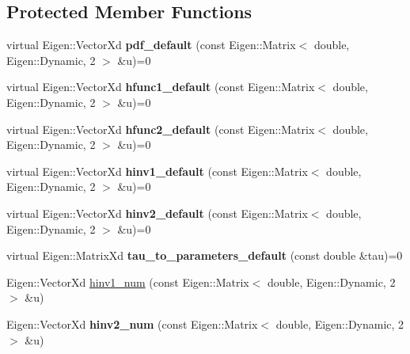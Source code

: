 \subsection*{Protected Member Functions}
\begin{DoxyCompactItemize}
\item 
virtual Eigen\+::\+Vector\+Xd {\bfseries pdf\+\_\+default} (const Eigen\+::\+Matrix$<$ double, Eigen\+::\+Dynamic, 2 $>$ \&u)=0\hypertarget{classvinecopulib_1_1_bicop_ab7ca8f265c7246a619324b6a2b9b33cb}{}\label{classvinecopulib_1_1_bicop_ab7ca8f265c7246a619324b6a2b9b33cb}

\item 
virtual Eigen\+::\+Vector\+Xd {\bfseries hfunc1\+\_\+default} (const Eigen\+::\+Matrix$<$ double, Eigen\+::\+Dynamic, 2 $>$ \&u)=0\hypertarget{classvinecopulib_1_1_bicop_a158a311fcf681027811785702452b888}{}\label{classvinecopulib_1_1_bicop_a158a311fcf681027811785702452b888}

\item 
virtual Eigen\+::\+Vector\+Xd {\bfseries hfunc2\+\_\+default} (const Eigen\+::\+Matrix$<$ double, Eigen\+::\+Dynamic, 2 $>$ \&u)=0\hypertarget{classvinecopulib_1_1_bicop_a7f23a0b1fc04c483a0dcf489700a0f30}{}\label{classvinecopulib_1_1_bicop_a7f23a0b1fc04c483a0dcf489700a0f30}

\item 
virtual Eigen\+::\+Vector\+Xd {\bfseries hinv1\+\_\+default} (const Eigen\+::\+Matrix$<$ double, Eigen\+::\+Dynamic, 2 $>$ \&u)=0\hypertarget{classvinecopulib_1_1_bicop_acb3ae8d10e8af947d2edd78f960b5f78}{}\label{classvinecopulib_1_1_bicop_acb3ae8d10e8af947d2edd78f960b5f78}

\item 
virtual Eigen\+::\+Vector\+Xd {\bfseries hinv2\+\_\+default} (const Eigen\+::\+Matrix$<$ double, Eigen\+::\+Dynamic, 2 $>$ \&u)=0\hypertarget{classvinecopulib_1_1_bicop_a2b9ccdd26482622c2487b0440b0621b1}{}\label{classvinecopulib_1_1_bicop_a2b9ccdd26482622c2487b0440b0621b1}

\item 
virtual Eigen\+::\+Matrix\+Xd {\bfseries tau\+\_\+to\+\_\+parameters\+\_\+default} (const double \&tau)=0\hypertarget{classvinecopulib_1_1_bicop_aaa9065f566b333feccafbe19e17f3052}{}\label{classvinecopulib_1_1_bicop_aaa9065f566b333feccafbe19e17f3052}

\end{DoxyCompactItemize}
{\bf }\par
\begin{DoxyCompactItemize}
\item 
Eigen\+::\+Vector\+Xd \hyperlink{classvinecopulib_1_1_bicop_a1220ac0456ae1a26c586cdc55258fabd}{hinv1\+\_\+num} (const Eigen\+::\+Matrix$<$ double, Eigen\+::\+Dynamic, 2 $>$ \&u)
\item 
Eigen\+::\+Vector\+Xd {\bfseries hinv2\+\_\+num} (const Eigen\+::\+Matrix$<$ double, Eigen\+::\+Dynamic, 2 $>$ \&u)\hypertarget{classvinecopulib_1_1_bicop_a36a542f48c3c453397d8a097e0e97ca3}{}\label{classvinecopulib_1_1_bicop_a36a542f48c3c453397d8a097e0e97ca3}

\end{DoxyCompactItemize}

